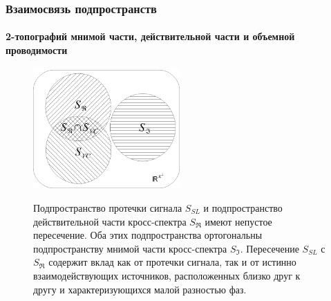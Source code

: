 \documentclass[12pt]{beamer}
\begin{document}
\begin{frame}[t]
    \frametitle{Взаимосвязь подпространств}
    \framesubtitle{2-топографий мнимой части, действительной части и объемной проводимости}
    
    \begin{figure}[htbp]
    \centering
    \includegraphics[width=0.5\textwidth]{SetsReImVC.jpg}

{\tiny Подпространство протечки сигнала $S_{SL}$ и подпространство действительной части кросс-спектра $S_{\Re}$
имеют непустое пересечение. Оба этих подпространства ортогональны подпространству мнимой
части кросс-спектра $S_{\Im}$.
Пересечение $S_{SL}$ с $S_{\Re}$ содержит вклад как от протечки сигнала,
так и от истинно взаимодействующих источников,
расположенных близко друг к другу и характеризующихся малой разностью фаз.}
\end{figure}%
\end{frame}
\end{document}

